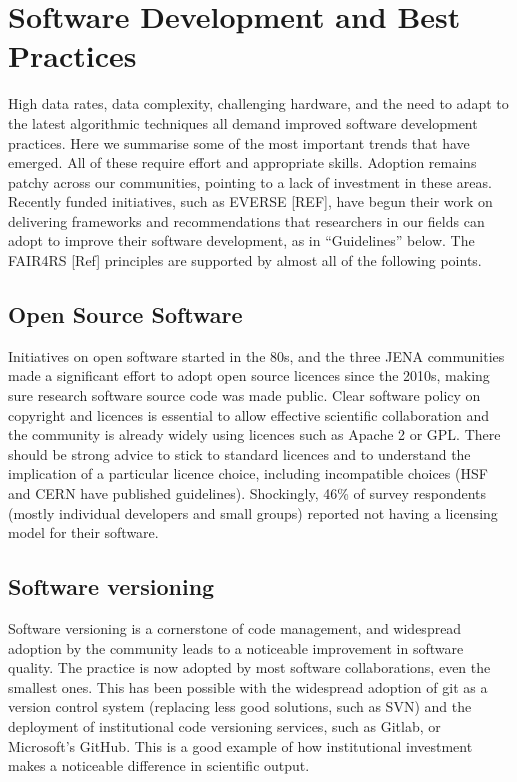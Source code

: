 \section{Software Development and Best Practices}

High data rates, data complexity, challenging hardware, and the need to adapt to the latest algorithmic techniques all demand improved software development practices. Here we summarise some of the most important trends that have emerged. All of these require effort and appropriate skills. Adoption remains patchy across our communities, pointing to a lack of investment in these areas. Recently funded initiatives, such as EVERSE [REF], have begun their work on delivering frameworks and recommendations that researchers in our fields can adopt to improve their software development, as in “Guidelines” below. The FAIR4RS [Ref] principles are supported by almost all of the following points.

\subsection{Open Source Software}

Initiatives on open software started in the 80s, and the three JENA communities made a significant effort to adopt open source licences since the 2010s, making sure research software source code was made public. Clear software policy on copyright and licences is essential to allow effective scientific collaboration and the community is already widely using licences such as Apache 2 or GPL. There should be strong advice to stick to standard licences and to understand the implication of a particular licence choice, including incompatible choices (HSF and CERN have published guidelines). Shockingly, 46\% of survey respondents (mostly individual developers and small groups) reported not having a licensing model for their software.

\subsection{Software versioning}

Software versioning is a cornerstone of code management, and widespread adoption by the community leads to a noticeable improvement in software quality. The practice is now adopted by most software collaborations, even the smallest ones. This has been possible with the widespread adoption of git as a version control system (replacing less good solutions, such as SVN) and the deployment of institutional code versioning services, such as Gitlab, or Microsoft’s GitHub. This is a good example of how institutional investment makes a noticeable difference in scientific output.

